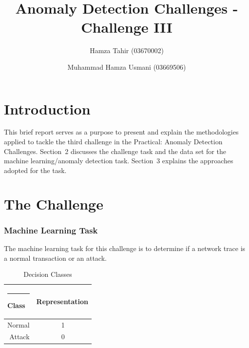 \documentclass{llncs}
\begin{document}
%
\frontmatter          %
%
\pagestyle{headings}  %

\mainmatter              %
%
\title{Anomaly Detection Challenges - Challenge III}
%

%
\author{Hamza Tahir (03670002) \and Muhammad Hamza Usmani (03669506)}
%
%

\maketitle              %


%
\section{Introduction}
%
This brief report serves as a purpose to present and explain the methodologies applied to tackle the third challenge in the Practical: Anomaly Detection Challenges. Section~2 discusses the challenge task and the data set for the machine learning/anomaly detection task. Section~3 explains the approaches adopted for the task.
%
\section{The Challenge}
%
%
\subsubsection{Machine Learning Task}
%
The machine learning task for this challenge is to determine if a network trace is a normal transaction or an attack.
\begin{table}
\caption{Decision Classes}
\begin{center}
\begin{tabular}{r@{\quad}rl}
\hline
\multicolumn{1}{l}{\rule{2pt}{0pt}
Class}&\multicolumn{2}{l}{Representation}\\[2pt]
\hline\rule{0pt}{12pt}
Normal&    1& \\
Attack&     0& \\[2pt]
\hline
\end{tabular}
\end{center}
\end{table}
%
\end{document}

